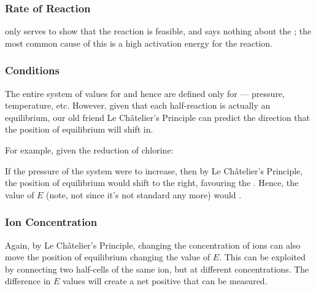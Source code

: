 			\subsubsection{Rate of Reaction}

				\Ecell{} only serves to show that the reaction is feasible, and says nothing about the ;
				the most common cause of this is a high activation energy for the reaction.


			\subsubsection{Conditions}

				The entire system of values for \Eo{} and hence \Ecell{} are defined only for  --- pressure,
				temperature, etc. However, given that each half-reaction is actually an equilibrium, our old friend Le Châtelier's Principle
				can predict the direction that the position of equilibrium will shift in.

				For example, given the reduction of chlorine:


				If the pressure of the system were to increase, then by Le Châtelier's Principle, the position of equilibrium would shift to
				the right, favouring the . Hence, the value of $E$ (note, not \Eo{} since it's
				not standard any more) would .


			\subsubsection{Ion Concentration}

				Again, by Le Châtelier's Principle, changing the concentration of ions can also move the position of equilibrium changing
				the value of $E$. This can be exploited by connecting two half-cells of the same ion, but at different concentrations. The
				difference in $E$ values will create a net positive \Ecell{} that can be measured.


